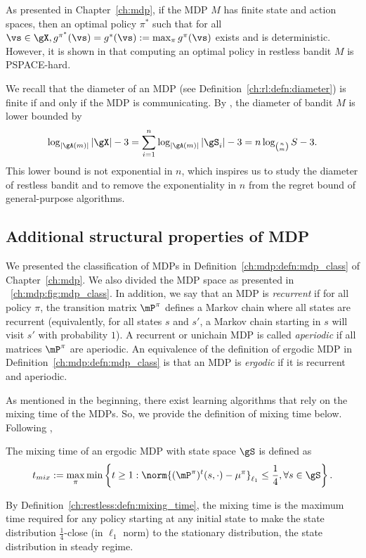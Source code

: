 As presented in Chapter~\ref{ch:mdp}, if the MDP $M$ has finite state and action spaces, then an optimal policy $\pi^*$ such that for all $\vs\in\gX, g^{\pi^*}(\vs)=g^*(\vs):=\max_{\pi}g^{\pi}(\vs)$ exists and is deterministic.
However, it is shown in \cite[Theorem~4]{papadimitriou1994complexity} that computing an optimal policy in restless bandit $M$ is PSPACE-hard.

We recall that the diameter of an MDP (see Definition~\ref{ch:rl:defn:diameter}) is finite if and only if the MDP is communicating.
By \cite[Appendix A]{jaksch2010near}, the diameter of bandit $M$ is lower bounded by
\begin{equation*}
    \log_{|\gA(m)|}|\gX| -3 = \sum_{i=1}^{n}\log_{|\gA(m)|}|\gS_i| -3 =n\log_{{n \choose m}}S -3.
\end{equation*}
This lower bound is not exponential in $n$, which inspires us to study the diameter of restless bandit and to remove the exponentiality in $n$ from the regret bound of general-purpose algorithms.

\subsection{Additional structural properties of MDP}
\label{ssec:mdp_params}

We presented the classification of MDPs in Definition~\ref{ch:mdp:defn:mdp_class} of Chapter~\ref{ch:mdp}.
We also divided the MDP space as presented in \figurename~\ref{ch:mdp:fig:mdp_class}.
In addition, we say that an MDP is \emph{recurrent} if for all policy $\pi$, the transition matrix $\mP^\pi$ defines a Markov chain where all states are recurrent (equivalently, for all states $s$ and $s'$, a Markov chain starting in $s$ will visit $s'$ with probability $1$).
A recurrent or unichain MDP is called \emph{aperiodic} if all matrices $\mP^\pi$ are aperiodic.
An equivalence of the definition of ergodic MDP in Definition~\ref{ch:mdp:defn:mdp_class} is that an MDP is \emph{ergodic} if it is recurrent and aperiodic.

As mentioned in the beginning, there exist learning algorithms that rely on the mixing time of the MDPs.
So, we provide the definition of mixing time below.
Following \cite[Definition 5.1]{wei2020model},
\begin{defn}
    \label{ch:restless:defn:mixing_time}
    The mixing time of an ergodic MDP with state space $\gS$ is defined as
    \begin{align*}
        t_{mix} := \max_{\pi}\min\left\{ t\ge1 : \norm{(\mP^\pi)^t(s,\cdot) - \mu^\pi}_{\ell_1} \le \frac14, \forall s\in\gS\right\}.
    \end{align*}
\end{defn}
By Definition~\ref{ch:restless:defn:mixing_time}, the mixing time is the maximum time required for any policy starting at any initial state to make the state distribution $\frac14$-close (in $\ell_1$ norm) to the stationary distribution, the state distribution in steady regime.

